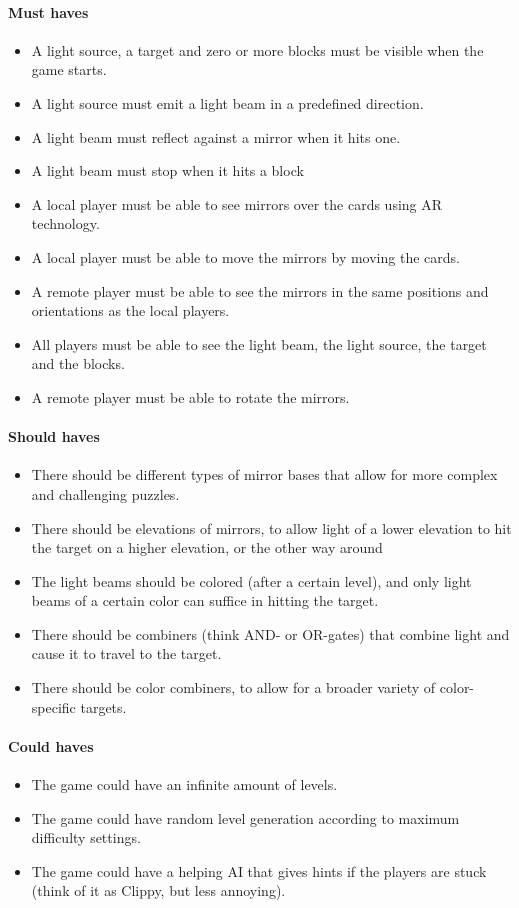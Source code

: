 \paragraph{Must haves}
\begin{itemize}
	\item A light source, a target and zero or more blocks must be visible when the game starts.
	\item A light source must emit a light beam in a predefined direction.
	\item A light beam must reflect against a mirror when it hits one.
	\item A light beam must stop when it hits a block
	\item A local player must be able to see mirrors over the cards using AR technology.
	\item A local player must be able to move the mirrors by moving the cards.
	\item A remote player must be able to see the mirrors in the same positions and 
		  orientations as the local players.
	\item All players must be able to see the light beam, the light source, the target and the blocks.
	\item A remote player must be able to rotate the mirrors.
\end{itemize}

\paragraph{Should haves}
\begin{itemize}
	\item There should be different types of mirror bases that allow for more complex
		  and challenging puzzles.
	\item There should be elevations of mirrors, to allow light of a lower elevation to hit the target on a higher elevation, or the other way around
	\item The light beams should be colored (after a certain level), and only light beams of a certain color can suffice in hitting the target.
	\item There should be combiners (think AND- or OR-gates) that combine light and cause it to travel to the target.
	\item There should be color combiners, to allow for a broader variety of color-specific targets.
\end{itemize}

\paragraph{Could haves}
\begin{itemize}
	\item The game could have an infinite amount of levels.
	\item The game could have random level generation according to maximum difficulty settings.
	\item The game could have a helping AI that gives hints if the players are stuck (think of it as Clippy, but less annoying).
\end{itemize}

